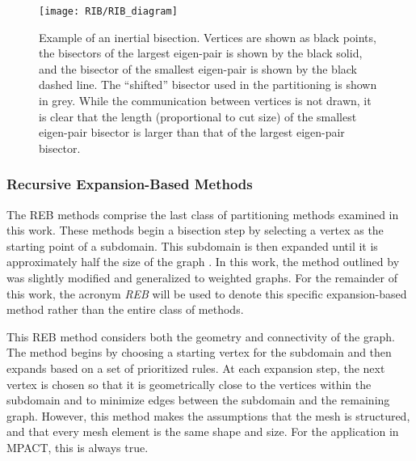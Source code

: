 {{{{        \begin{figure}
          \centering
          \texttt{[image: RIB/RIB\_diagram]}
          \caption{
            Example of an inertial bisection.
            Vertices are shown as black points, the bisectors of the largest eigen-pair is shown by the black solid, and the bisector of the smallest eigen-pair is shown by the black dashed line.
            The ``shifted'' bisector used in the partitioning is shown in grey.
            While the communication between vertices is not drawn, it is clear that the length (proportional to cut size) of the smallest eigen-pair bisector is larger than that of the largest eigen-pair bisector.
            \label{fig:Spatial Decomposition:RIB Diagram}
          }
        \end{figure}
      }
      \subsubsection{Recursive Expansion-Based Methods}{\label{sssec:Spatial Decomposition:Recursive Expansion-Based Methods}
        The \ac{REB} methods comprise the last class of partitioning methods examined in this work.
        These methods begin a bisection step by selecting a vertex as the starting point of a subdomain.
        This subdomain is then expanded until it is approximately half the size of the graph \cite{Farhat1988,Nasra1991,Elsner1997,Fitzgerald2017}.
        In this work, the method outlined by \citet{Fitzgerald2017} was slightly modified and generalized to weighted graphs.
        For the remainder of this work, the acronym \emph{\ac{REB}} will be used to denote this specific expansion-based method rather than the entire class of methods.

        This \ac{REB} method considers both the geometry and connectivity of the graph.
        The method begins by choosing a starting vertex for the subdomain and then expands based on a set of prioritized rules.
        At each expansion step, the next vertex is chosen so that it is geometrically close to the vertices within the subdomain and to minimize edges between the subdomain and the remaining graph.
        However, this method makes the assumptions that the mesh is structured, and that every mesh element is the same shape and size.
        For the application in MPACT, this is always true.

}}}}
